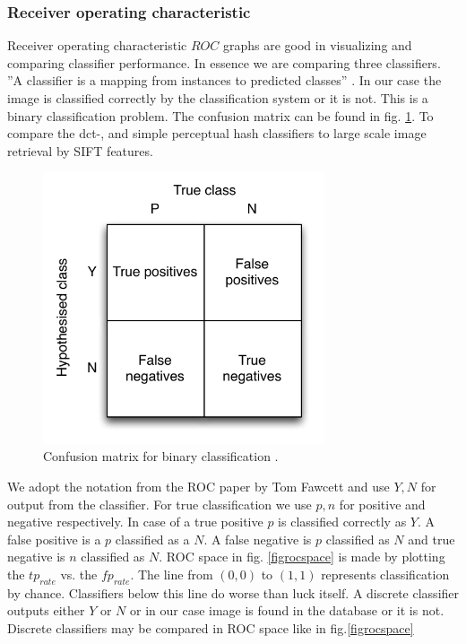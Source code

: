 \documentclass[english,12pt,a4paper,pdftex,elec,utf8]{aaltothesis}
\begin{document}
\subsubsection{Receiver operating characteristic}
Receiver operating characteristic \(ROC\) graphs are good in visualizing and comparing classifier performance. In essence we are comparing three classifiers. ''A classifier is a mapping from instances to predicted classes'' \cite{Fawcett2006}. In our case the image is classified correctly by the classification system or it is not. This is a binary classification problem. The confusion matrix can be found in fig. \ref{figconfusion}. To compare the dct-, and simple perceptual hash classifiers to large scale image retrieval by SIFT features.

\begin{figure}[htb]
\begin{center}
\includegraphics[height=8cm]{figures/confusion}
\end{center}
\caption{Confusion matrix for binary classification \cite{Fawcett2006}. }
\label{figconfusion}
\end{figure}

We adopt the notation from the ROC paper by Tom Fawcett and use ${Y,N}$ for output from the classifier. For true classification we use ${p,n}$ for positive and negative respectively. In case of a true positive $p$ is classified correctly as $Y$. A false positive is a $p$ classified as a $N$. A false negative is $p$ classified as $N$ and true negative is $n$ classified as $N$. ROC space in fig. \ref{figrocspace} is made by plotting the $tp_{rate}$ vs. the $fp_{rate}$. The line from $(0,0)$ to $(1,1)$ represents classification by chance. Classifiers below this line do worse than luck itself. A discrete classifier outputs either $Y$ or $N$ or in our case image is found in the database or it is not. Discrete classifiers may be compared in ROC space like in fig.\ref{figrocspace} \cite{Fawcett2006}
\end{document}
